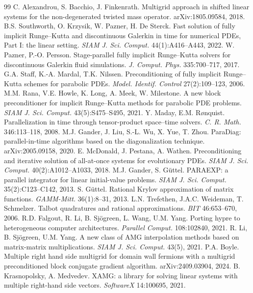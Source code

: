 \documentclass[11pt,a4paper]{article}
\begin{document}
\begin{thebibliography}{99}
 C. Alexandrou, S. Bacchio, J. Finkenrath. Multigrid approach in shifted linear systems for the non-degenerated twisted mass operator. arXiv:1805.09584, 2018.
 B.S. Southworth, O. Krzysik, W. Pazner, H. De Sterck. Fast solution of fully implicit Runge--Kutta and discontinuous Galerkin in time for numerical PDEs, Part I: the linear setting. \emph{SIAM J. Sci. Comput.} 44(1):A416--A443, 2022.
 W. Pazner, P.-O. Persson. Stage-parallel fully implicit Runge--Kutta solvers for discontinuous Galerkin fluid simulations. \emph{J. Comput. Phys.} 335:700--717, 2017.
 G.A. Staff, K.-A. Mardal, T.K. Nilssen. Preconditioning of fully implicit Runge--Kutta schemes for parabolic PDEs. \emph{Model. Identif. Control} 27(2):109--123, 2006.
 M.M. Rana, V.E. Howle, K. Long, A. Meek, W. Milestone. A new block preconditioner for implicit Runge--Kutta methods for parabolic PDE problems. \emph{SIAM J. Sci. Comput.} 43(5):S475--S495, 2021.
 Y. Maday, E.M. R{\o}nquist. Parallelization in time through tensor-product space--time solvers. \emph{C. R. Math.} 346:113--118, 2008.
 M.J. Gander, J. Liu, S.-L. Wu, X. Yue, T. Zhou. ParaDiag: parallel-in-time algorithms based on the diagonalization technique. arXiv:2005.09158, 2020.
 E. McDonald, J. Pestana, A. Wathen. Preconditioning and iterative solution of all-at-once systems for evolutionary PDEs. \emph{SIAM J. Sci. Comput.} 40(2):A1012--A1033, 2018.
 M.J. Gander, S. G\"uttel. PARAEXP: a parallel integrator for linear initial-value problems. \emph{SIAM J. Sci. Comput.} 35(2):C123--C142, 2013.
 S. G\"uttel. Rational Krylov approximation of matrix functions. \emph{GAMM-Mitt.} 36(1):8--31, 2013.
 L.N. Trefethen, J.A.C. Weideman, T. Schmelzer. Talbot quadratures and rational approximations. \emph{BIT} 46:653--670, 2006.
 R.D. Falgout, R. Li, B. Sj\"ogreen, L. Wang, U.M. Yang. Porting hypre to heterogeneous computer architectures. \emph{Parallel Comput.} 108:102840, 2021.
 R. Li, B. Sj\"ogreen, U.M. Yang. A new class of AMG interpolation methods based on matrix-matrix multiplications. \emph{SIAM J. Sci. Comput.} 43(5), 2021.
 P.A. Boyle. Multiple right hand side multigrid for domain wall fermions with a multigrid preconditioned block conjugate gradient algorithm. arXiv:2409.03904, 2024.
 B. Krasnopolsky, A. Medvedev. XAMG: a library for solving linear systems with multiple right-hand side vectors. \emph{SoftwareX} 14:100695, 2021.

\end{thebibliography}
\end{document}
